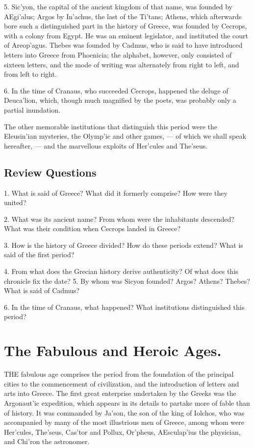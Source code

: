 \documentclass[openany,a4paper]{memoir}
\begin{document}
5. Sic'yon, the capital of the ancient kingdom of that 
name, was founded by AEgi'alus; Argos by In'achus, the 
last of the Ti'tans; Athens, which afterwards bore such a 
distinguished part in the history of Greece, was founded by 
Cecrops, with a colony from Egypt. He was an eminent 
legislator, and instituted the court of Areop'agus. Thebes 
was founded by Cadmus, who is said to have introduced 
letters into Greece from Phoenicia; the alphabet, however, 
only consisted of sixteen letters, and the mode of writing 
was alternately from right to left, and from left to right. 

6. In the time of Cranaus, who succeeded Cecrops, happened the deluge of Deuca'lion, which, though much magnified by the poets, was probably only a partial inundation. 

The other memorable institutions that distinguish this 
period were the Eleusin'ian mysteries, the Olymp'ic and 
other games, — of which we shall speak hereafter, — and the 
marvellous exploits of Her'cules and The'seus. 


\section{Review Questions}

1. What is said of Greece? What did it formerly comprise? How were they united?

2. What was its ancient name? From 
whom were the inhabitants descended? What was their condition when 
Cecrops landed in Greece? 

3. How is the history of Greece divided? How do these periods extend? What is said of the first period? 

4. From what does the Grecian 
history derive authenticity? Of what does this chronicle fix the date?  
5. By whom was Sicyon founded? Argos? Athens? Thebes? What is 
said of Cadmus?  

6. In the time of Cranaus, what happened? What 
institutions distinguished this period? 





\chapter{The Fabulous and Heroic Ages.} 

THE fabulous age comprises the period from the foundation of the principal cities to the commencement of civilization, and the introduction of letters and arts into Greece. 
The first great enterprise undertaken by the Greeks was the 
Argonaut'ic expedition, which appears in its details to partake more of fable than of history. It was commanded by 
Ja'son, the son of the king of Iolchos, who was accompanied by many of the most illustrious men of Greece, 
among whom were Her'cules, The'seus, Cas'tor and Pollux, Or'pheus, AEsculap'ius the physician, and Chi'ron the 
astronomer. 
\end{document}
